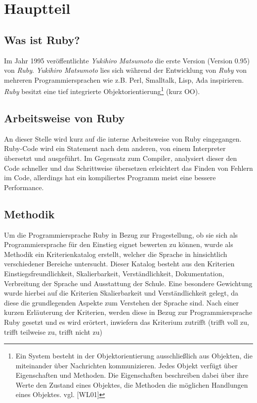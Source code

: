 \documentclass[12pt,DIV=14, version=first, BCOR=10mm,a4paper,twoside,parskip=half-,headsepline,headinclude]{scrartcl}
\begin{document}
\section{Hauptteil}

\subsection{Was ist Ruby?} \label{Was ist Ruby?}
\begin{flushleft}
Im Jahr 1995 veröffentlichte \textit{Yukihiro Matsumoto} die erste Version (Version 0.95) von \textit{\glqq Ruby\grqq}. \textit{Yukihiro Matsumoto} lies sich während der Entwicklung von \textit{\glqq Ruby\grqq} von mehreren Programmiersprachen wie z.B. Perl, Smalltalk, Lisp, Ada inspirieren. \textit{Ruby} besitzt eine tief integrierte 
Objektorientierung\footnote{\label{foot:1} Ein System besteht in der Objektorientierung ausschließlich aus Objekten, die miteinander über Nachrichten kommunizieren. Jedes Objekt verfügt über Eigenschaften und Methoden. Die Eigenschaften beschreiben dabei über ihre Werte den Zustand eines Objektes, die Methoden die möglichen Handlungen eines Objektes. vgl. [WL01]} (kurz OO).
\end{flushleft}

\subsection{Arbeitsweise von Ruby}
\begin{flushleft}
An dieser Stelle wird kurz auf die interne Arbeitsweise von Ruby eingegangen. Ruby-Code wird ein Statement nach dem anderen, von einem Interpreter übersetzt und ausgeführt. Im Gegensatz zum Compiler, analysiert dieser den Code schneller und das Schrittweise übersetzen erleichtert das Finden von Fehlern im Code, allerdings hat ein kompiliertes Programm meist eine bessere Performance.
\end{flushleft}

\subsection{Methodik}
\begin{flushleft}
Um die Programmiersprache Ruby in Bezug zur Fragestellung, ob sie sich als Programmiersprache für den Einstieg eignet bewerten zu können, wurde als Methodik ein Kriterienkatalog erstellt, welcher die Sprache in hinsichtlich verschiedener Bereiche untersucht. Dieser Katalog besteht aus den Kriterien Einstiegsfreundlichkeit, Skalierbarkeit, Verständlichkeit, Dokumentation, Verbreitung der Sprache und Ausstattung der Schule. Eine besondere Gewichtung wurde hierbei auf die Kriterien Skalierbarkeit und Verständlichkeit gelegt, da diese die grundlegenden Aspekte zum Verstehen der Sprache sind. Nach einer kurzen Erläuterung der Kriterien, werden diese in Bezug zur Programmiersprache Ruby gesetzt und es wird erörtert, inwiefern das Kriterium zutrifft (trifft voll zu, trifft teilweise zu, trifft nicht zu)
\end{flushleft}
\end{document}
